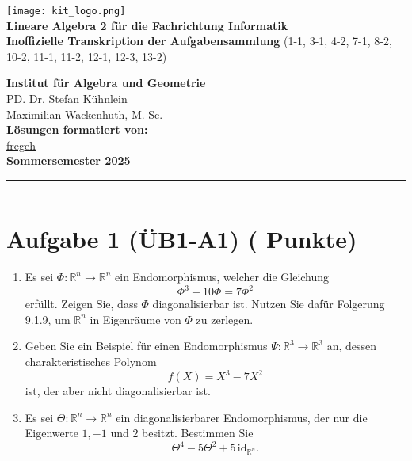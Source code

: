 \documentclass[11pt, a4paper]{article}
\newcounter{aufg}    %
\newcommand{\aufgabe}[2]{%
  \refstepcounter{aufg}%
  \section{Aufgabe #1%
    \if\relax\detokenize{#2}\relax\else\hfill\normalfont\normalsize(#2 Punkte)\fi}%
  \label{aufgabe:\theaufg}%
  \par\vspace{.5\baselineskip}%
}
\begin{document}
\noindent
\begin{minipage}[t]{0.6\textwidth}
    \vspace{0pt}
    \texttt{[image: kit\_logo.png]} \\ %
    {\Large\bfseries Lineare Algebra 2 für die Fachrichtung Informatik} \\[0.5em]
    {\large\bfseries Inoffizielle Transkription der Aufgabensammlung}
    {(1-1, 3-1, 4-2, 7-1, 8-2, 10-2, 11-1, 11-2, 12-1, 12-3, 13-2)}
\end{minipage}%
\begin{minipage}[t]{0.4\textwidth}
    \vspace{0pt}
    \raggedleft
    \small
    \textbf{Institut für Algebra und Geometrie} \\
    PD. Dr. Stefan Kühnlein \\
    Maximilian Wackenhuth, M. Sc. \\
    \vspace{0.5em}
    \textbf{Lösungen formatiert von:} \\
    \href{https://github.com/fregeh}{fregeh} \\
    \vspace{1em}
    \textbf{Sommersemester 2025}
\end{minipage}

\vspace{0.5cm}
\hrule

\tableofcontents
\bigskip
\hrule

\aufgabe{1 (ÜB1-A1)}{}
\begin{enumerate}
  \item Es sei $\Phi:\mathbb{R}^n\to\mathbb{R}^n$ ein Endomorphismus, welcher die Gleichung
  \[
    \Phi^3+10\Phi=7\Phi^2
  \]
  erfüllt. Zeigen Sie, dass $\Phi$ diagonalisierbar ist. Nutzen Sie dafür Folgerung 9.1.9, um $\mathbb{R}^n$ in Eigenräume von $\Phi$ zu zerlegen.

  \item Geben Sie ein Beispiel für einen Endomorphismus $\Psi:\mathbb{R}^3\to\mathbb{R}^3$ an, dessen charakteristisches Polynom
  \[
    f(X)=X^3-7X^2
  \]
  ist, der aber nicht diagonalisierbar ist.

  \item Es sei $\Theta:\mathbb{R}^n\to\mathbb{R}^n$ ein diagonalisierbarer Endomorphismus, der nur die Eigenwerte $1,-1$ und $2$ besitzt. Bestimmen Sie
  \[
    \Theta^4-5\Theta^2+5\,\mathrm{id}_{\mathbb{R}^n}.
  \]

\end{enumerate}
\end{document}
